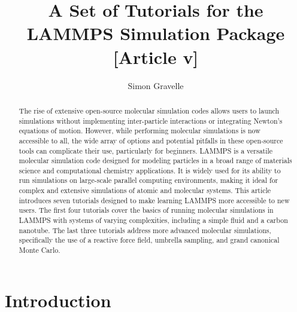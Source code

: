 \documentclass[9pt,tutorial]{livecoms}
\title{A Set of Tutorials for the LAMMPS Simulation Package [Article v\versionnumber]}
\author[1*]{Simon Gravelle}
\affil[1]{University Grenoble Alpes, CNRS, LIPhy, Grenoble, 38000, France}
\begin{document}
\begin{frontmatter}
\maketitle

\begin{abstract}
The rise of extensive open-source molecular simulation codes allows users to launch simulations without implementing inter-particle interactions or integrating Newton's equations of motion. However, while performing molecular simulations is now accessible to all, the wide array of options and potential pitfalls in these open-source tools can complicate their use, particularly for beginners. LAMMPS is a versatile molecular simulation code designed for modeling particles in a broad range of materials science and computational chemistry applications. It is widely used for its ability to run simulations on large-scale parallel computing environments, making it ideal for complex and extensive simulations of atomic and molecular systems. This article introduces seven tutorials designed to make learning LAMMPS more accessible to new users. The first four tutorials cover the basics of running molecular simulations in LAMMPS with systems of varying complexities, including a simple fluid and a carbon nanotube. The last three tutorials address more advanced molecular simulations, specifically the use of a reactive force field, umbrella sampling, and grand canonical Monte Carlo.
\end{abstract}

\end{frontmatter}

\section{Introduction}



\end{document}
